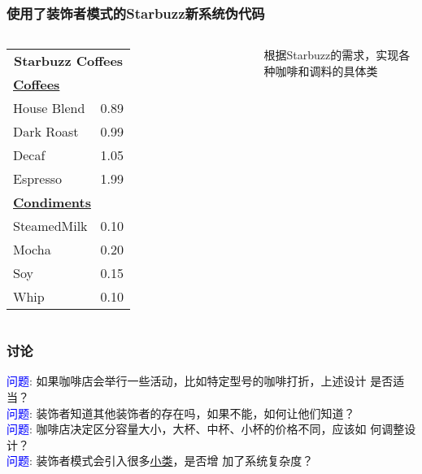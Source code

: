\documentclass[compress]{beamer}
\begin{document}
{  \begin{frame}
    \frametitle{使用了装饰者模式的Starbuzz新系统伪代码}
     {
      \begin{columns}

        \column{0.5\hsize}

      \qquad\begin{tabular}{|lc|}
        \hline
        \multicolumn{2}{|c|}{\Large \textbf{Starbuzz Coffees}} \\
        \multicolumn{2}{|l|}{\textbf{\uline{Coffees}}} \\
        House Blend & 0.89 \\ 
        Dark Roast & 0.99 \\ 
        Decaf & 1.05 \\
        Espresso & 1.99 \\
        \multicolumn{2}{|l|}{\textbf{\uline{Condiments}}} \\
        SteamedMilk & 0.10 \\
        Mocha & 0.20 \\
        Soy & 0.15 \\
        Whip & 0.10 \\
        \hline
      \end{tabular}

      \column{0.5\hsize}

      \noindent 根据Starbuzz的需求，实现各种咖啡和调料的具体类
    \end{columns}
    }


     {
      \verbbeverage
      \verbcondiment
    }
     {
      \verbespresso
    }
     {
      \verbmocha
    }
     {
      \verbtest
    }
     {
      \verboutput
    }
  \end{frame}
}

\begin{frame}
  \frametitle{讨论}
  \begin{overprint}
     {
      \textcolor{blue}{问题}:  如果咖啡店会举行一些活动，比如特定型号的咖啡打折，上述设计
      是否适当？ \\[3ex]
    }
     {
      \textcolor{blue}{问题}:  装饰者知道其他装饰者的存在吗，如果不能，如何让他们知道？ \\[3ex]
    }
     {
      \textcolor{blue}{问题}:  咖啡店决定区分容量大小，大杯、中杯、小杯的价格不同，应该如
      何调整设计？ \\[3ex]
    }
     {
      \textcolor{blue}{问题}:  装饰者模式会引入很多\uline{小类}，是否增
      加了系统复杂度？
    }
    \end{overprint} 
\end{frame}
\end{document}
